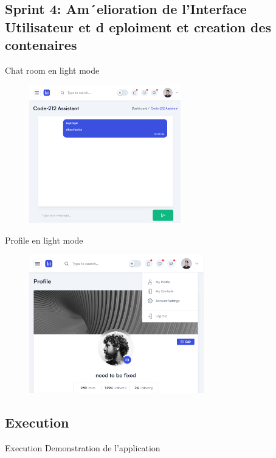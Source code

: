 \documentclass[aspectratio=169]{beamer}
\begin{document}
\subsection{Sprint 4: Am´elioration de l’Interface Utilisateur et d eploiment et creation des
    contenaires}

\begin{frame}{Chat room en light mode}
    \begin{figure}[htpb]
        \centering
        \includegraphics[height=6cm]{pic/light-chat.png}
    \end{figure}
\end{frame}

\begin{frame}{Profile en light mode}
    \begin{figure}[htpb]
        \centering
        \includegraphics[height=6cm]{pic/light-profile.png}
    \end{figure}
\end{frame}

\subsection{Execution}
\begin{frame}{Execution}
    Demonstration de l'application
\end{frame}
\end{document}
